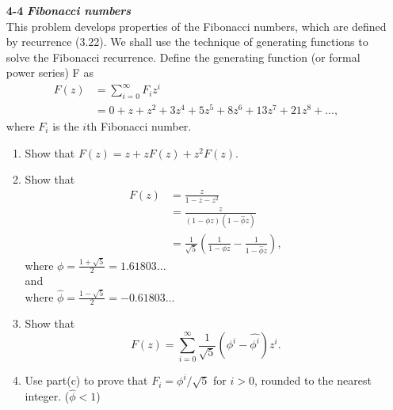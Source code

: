 \documentclass[fontsize=12pt,paper=a4]{book}
\begin{document}
\begin{enumerate}
	\item[\textbf{4-4}]
		\textbf{\textit{Fibonacci numbers}}\\
		This problem develops properties of the Fibonacci numbers, which are defined by recurrence (3.22). We shall use the technique of generating functions to solve the Fibonacci recurrence. Define the generating function (or formal power series) F as
		\begin{equation*}
			\begin{split}
				F(z) & = \sum_{i=0}^\infty F_iz^i\\
				& = 0 + z + z^2 + 3z^4 + 5z^5 + 8z^6 + 13z^7 + 21z^8 + ... ,
			\end{split}
		\end{equation*}
		where $F_i$ is the $i$th Fibonacci number.
		\begin{enumerate}
			\item Show that $F(z) = z + zF(z) + z^2F(z)$.
			\item Show that
			\begin{equation*}
				\begin{split}
					F(z) & = \frac{z}{1-z-z^2} \\
					& = \frac{z}{(1-\phi z)(1-\hat{\phi} z)}\\
					& = \frac{1}{\sqrt{5}} \left( \frac{1}{1-\phi z} - \frac{1}{1-\hat{\phi} z} \right),
				\end{split}
			\end{equation*}
			where $\phi = \frac{1+\sqrt{5}}{2} = 1.61803 \dots$\\
			and\\
			where $\hat{\phi} = \frac{1-\sqrt{5}}{2} = -0.61803 \dots$
			\item Show that
			\[ F(z) = \sum_{i=0}^{\infty} \frac{1}{\sqrt{5}} (\phi^i-\hat{\phi^i}) z^i . \]
			\item Use part(c) to prove that $F_i = \phi^i/\sqrt{5}$ for $i>0$, rounded to the nearest integer. ($\hat{\phi} < 1$)
		\end{enumerate}
		

\end{enumerate}
\end{document}
